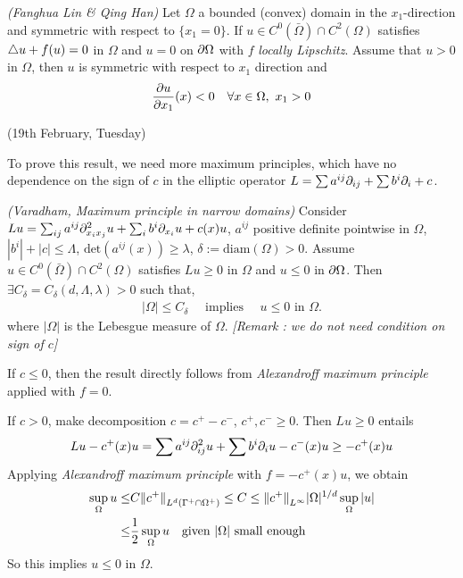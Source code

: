\documentclass[12pt,a4paper]{article}
\newenvironment{proof}
{\begin{changemargin}{0.5cm}{0.5cm} 
	}%
	{\end{changemargin}
}
\newenvironment{p}
{\begin{proof} 
	}%
	{\end{proof}
}
\begin{document}
\lem \emph{(Fanghua Lin \& Qing Han)} Let $\Omega$ a bounded (convex) domain in the $x_1$-direction and symmetric with respect to $\{x_1 =0 \}$. If $u\in C^0(\bar{\Omega}) \cap C^2(\Omega)$ satisfies $\triangle u + f(u) =0$ in $\Omega$ and $u =0$ on $\partial \Omega$ with $f$ \emph{locally Lipschitz}. Assume that $u>0$ in $\Omega$, then $u$ is symmetric with respect to $x_1$ direction and
\begin{align*}
\frac{\partial u}{\partial x_1}(x) < 0 \quad \forall x\in \Omega, \,\, x_1>0
\end{align*}
\s

\newday

(19th February, Tuesday)
\s

To prove this result, we need more maximum principles, which have no dependence on the sign of $c$ in the elliptic operator $L = \sum a^{ij} \partial_{ij} + \sum b^i \partial_i + c$.
\s

\thm \emph{(Varadham, Maximum principle in narrow domains)} Consider $Lu = \sum_{ij}a^{ij} \partial^2_{x_i x_j} u + \sum_i b^i \partial_{x_i} u + c(x) u$, $a^{ij}$ positive definite pointwise in $\Omega$, $|b^i| + |c| \leq \Lambda$, $\text{det}(a^{ij}(x)) \geq \lambda$, $\delta := \text{diam}(\Omega)>0$. Assume $u \in C^0(\bar{\Omega}) \cap C^2(\Omega)$ satisfies $Lu \geq 0$ in $\Omega$ and $u\leq 0$ in $\partial \Omega$. Then $\exists C_{\delta} = C_{\delta}(d, \Lambda, \lambda) >0$ such that,
\begin{align*}
|\Omega|\leq C_{\delta} \quad \text{ implies } \quad u\leq 0\,\, \text{in } \Omega.
\end{align*}
where $|\Omega|$ is the Lebesgue measure of $\Omega$.
\emph{[Remark : we do not need condition on sign of $c$]}
\begin{p}
\pf If $c\leq 0$, then the result directly follows from \emph{Alexandroff maximum principle} applied with $f=0$.
\s

If $c>0$, make decomposition $c= c^+ - c^-$, $c^+, c^- \geq 0$. Then $Lu \geq 0$ entails
\begin{align*}
Lu - c^+(x)u = \sum a^{ij} \partial^2_{ij} u + \sum b^i \partial_i u - c^-(x) u  \geq -c^+(x) u
\end{align*}
Applying \emph{Alexandroff maximum principle} with $f= -c^+(x) u$, we obtain
\begin{align*}
\sup_{\Omega} u \leq & C \snorms{c^+ }{L^d (\Gamma^+ \cap \Omega^+)} \leq  C \leq \snorms{c^+}{L^{\infty}} |\Omega|^{1/d} \sup_{\Omega} |u| \\
\leq & \frac{1}{2} \sup_{\Omega} u \quad \text{given } |\Omega| \text{ small enough}
\end{align*}
So this implies $u\leq 0$ in $\Omega$.

\eop
\end{p}
\s
\end{document}
